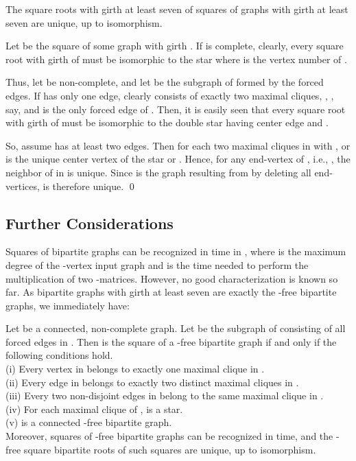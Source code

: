 \documentclass[proceedings]{stacs}
\begin{document}
\begin{corollary}\label{coro:unique}
The square roots with girth at least seven of squares of graphs with girth at least seven are
unique, up to isomorphism.
\end{corollary}
\proof Let  be the square of some graph  with girth . If  is complete, clearly,
every square root with girth  of  must be isomorphic to the star  where
 is the vertex number of .

Thus, let  be non-complete, and let  be the subgraph of  formed by the forced edges. If
 has only one edge,  clearly consists of exactly two maximal cliques, , , say,
and  is the only forced edge of . Then, it is easily seen that every square root
with girth  of  must be isomorphic to the double star  having center edge 
and .

So, assume  has at least two edges. Then for each two maximal cliques
 in  with ,  or  is the unique center vertex of the star
 or . Hence, for any end-vertex  of , i.e., ,
the neighbor of  in  is unique. Since  is the graph resulting from  by deleting
all end-vertices,  is therefore unique. \qed


\subsection{Further Considerations}\label{sec:girth-k}

Squares of bipartite graphs can be recognized in  time in \cite{Lau2006},
where  is the maximum degree of the -vertex input graph  and  is
the time needed to perform the multiplication of two -matrices. However, no good
characterization is known so far. As bipartite graphs with girth at least seven are exactly the
-free bipartite graphs, we immediately have:

\begin{corollary}\label{coro:C4C6freebip}
Let  be a connected, non-complete graph. Let  be the subgraph of  consisting of all forced
edges in . Then  is the square of a -free bipartite graph if and only if the following
conditions hold.\\
(i)  Every vertex in  belongs to exactly one maximal clique in .\\
(ii)  Every edge in  belongs to exactly two distinct maximal cliques in .\\
(iii) Every two non-disjoint edges in  belong to the same maximal clique in .\\
(iv)  For each maximal clique  of ,  is a star.\\
(v)    is a connected -free bipartite graph.\\
Moreover, squares of -free bipartite graphs can be recognized in  time, and the
-free square bipartite roots of such squares are unique, up to isomorphism.
\end{corollary}
\end{document}

